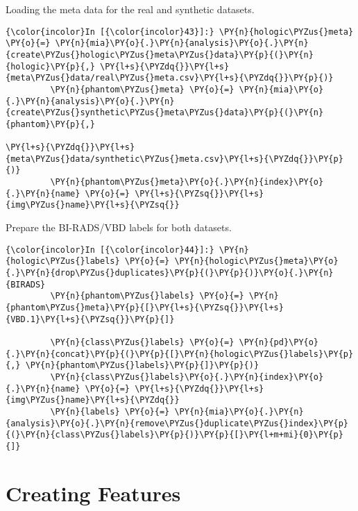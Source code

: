     Loading the meta data for the real and synthetic datasets.

    \begin{Verbatim}[commandchars=\\\{\}]
{\color{incolor}In [{\color{incolor}43}]:} \PY{n}{hologic\PYZus{}meta} \PY{o}{=} \PY{n}{mia}\PY{o}{.}\PY{n}{analysis}\PY{o}{.}\PY{n}{create\PYZus{}hologic\PYZus{}meta\PYZus{}data}\PY{p}{(}\PY{n}{hologic}\PY{p}{,} \PY{l+s}{\PYZdq{}}\PY{l+s}{meta\PYZus{}data/real\PYZus{}meta.csv}\PY{l+s}{\PYZdq{}}\PY{p}{)}
         \PY{n}{phantom\PYZus{}meta} \PY{o}{=} \PY{n}{mia}\PY{o}{.}\PY{n}{analysis}\PY{o}{.}\PY{n}{create\PYZus{}synthetic\PYZus{}meta\PYZus{}data}\PY{p}{(}\PY{n}{phantom}\PY{p}{,}
                                                                \PY{l+s}{\PYZdq{}}\PY{l+s}{meta\PYZus{}data/synthetic\PYZus{}meta.csv}\PY{l+s}{\PYZdq{}}\PY{p}{)}
         \PY{n}{phantom\PYZus{}meta}\PY{o}{.}\PY{n}{index}\PY{o}{.}\PY{n}{name} \PY{o}{=} \PY{l+s}{\PYZsq{}}\PY{l+s}{img\PYZus{}name}\PY{l+s}{\PYZsq{}}
\end{Verbatim}

    Prepare the BI-RADS/VBD labels for both datasets.

    \begin{Verbatim}[commandchars=\\\{\}]
{\color{incolor}In [{\color{incolor}44}]:} \PY{n}{hologic\PYZus{}labels} \PY{o}{=} \PY{n}{hologic\PYZus{}meta}\PY{o}{.}\PY{n}{drop\PYZus{}duplicates}\PY{p}{(}\PY{p}{)}\PY{o}{.}\PY{n}{BIRADS}
         \PY{n}{phantom\PYZus{}labels} \PY{o}{=} \PY{n}{phantom\PYZus{}meta}\PY{p}{[}\PY{l+s}{\PYZsq{}}\PY{l+s}{VBD.1}\PY{l+s}{\PYZsq{}}\PY{p}{]}

         \PY{n}{class\PYZus{}labels} \PY{o}{=} \PY{n}{pd}\PY{o}{.}\PY{n}{concat}\PY{p}{(}\PY{p}{[}\PY{n}{hologic\PYZus{}labels}\PY{p}{,} \PY{n}{phantom\PYZus{}labels}\PY{p}{]}\PY{p}{)}
         \PY{n}{class\PYZus{}labels}\PY{o}{.}\PY{n}{index}\PY{o}{.}\PY{n}{name} \PY{o}{=} \PY{l+s}{\PYZdq{}}\PY{l+s}{img\PYZus{}name}\PY{l+s}{\PYZdq{}}
         \PY{n}{labels} \PY{o}{=} \PY{n}{mia}\PY{o}{.}\PY{n}{analysis}\PY{o}{.}\PY{n}{remove\PYZus{}duplicate\PYZus{}index}\PY{p}{(}\PY{n}{class\PYZus{}labels}\PY{p}{)}\PY{p}{[}\PY{l+m+mi}{0}\PY{p}{]}
\end{Verbatim}

    \section{Creating Features}\label{creating-features}

